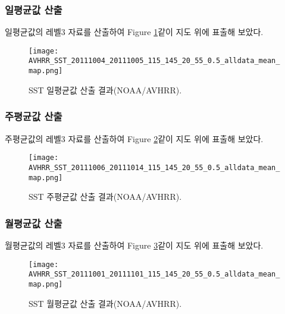 \subsubsection{일평균값 산출}

일평균값의 레벨3 자료를 산출하여 Figure \ref{fig:daily_mean1}\과 같이 지도 위에 표출해 보았다. 

\begin{figure}[htbp]
	\centerline{\texttt{[image: AVHRR\_SST\_20111004\_20111005\_115\_145\_20\_55\_0.5\_alldata\_mean\_map.png]}}
	\caption{SST 일평균값 산출 결과(NOAA/AVHRR).}
	\label{fig:daily_mean1}
\end{figure}

\newpage
\subsubsection{주평균값 산출}

주평균값의 레벨3 자료를 산출하여 Figure \ref{fig:weekly_mean1}\과 같이 지도 위에 표출해 보았다. 

\begin{figure}[htbp]
	\centerline{\texttt{[image: AVHRR\_SST\_20111006\_20111014\_115\_145\_20\_55\_0.5\_alldata\_mean\_map.png]}}
	\caption{SST 주평균값 산출 결과(NOAA/AVHRR).}
	\label{fig:weekly_mean1}
\end{figure}

\newpage
\subsubsection{월평균값 산출}

월평균값의 레벨3 자료를 산출하여 Figure \ref{fig:monthly_mean1}\과 같이 지도 위에 표출해 보았다. 

\begin{figure}[htbp]
	\centerline{\texttt{[image: AVHRR\_SST\_20111001\_20111101\_115\_145\_20\_55\_0.5\_alldata\_mean\_map.png]}}
	\caption{SST 월평균값 산출 결과(NOAA/AVHRR).}
	\label{fig:monthly_mean1}
\end{figure}




